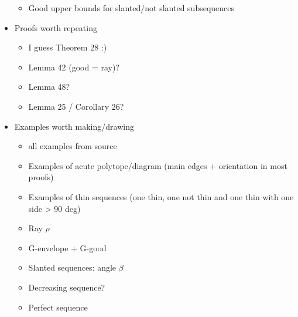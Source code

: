 \begin{itemize}
\begin{itemize}
    \item Good upper bounds for slanted/not slanted subsequences
  \end{itemize}
  \item Proofs worth repeating
  \begin{itemize}
    \item I guess Theorem 28 :)
    \item Lemma 42 (good = ray)?
    \item Lemma 48?
    \item Lemma 25 / Corollary 26?
  \end{itemize}
  \item Examples worth making/drawing
  \begin{itemize}
    \item all examples from source
    \item Examples of acute polytope/diagram (main edges + orientation in most proofs)
    \item Examples of thin sequences (one thin, one not thin and one thin with one side > 90 deg)
    \item Ray $\rho$
    \item G-envelope + G-good
    \item Slanted sequences: angle $\beta$
    \item Decreasing sequence?
    \item Perfect sequence
  \end{itemize}
\end{itemize}

